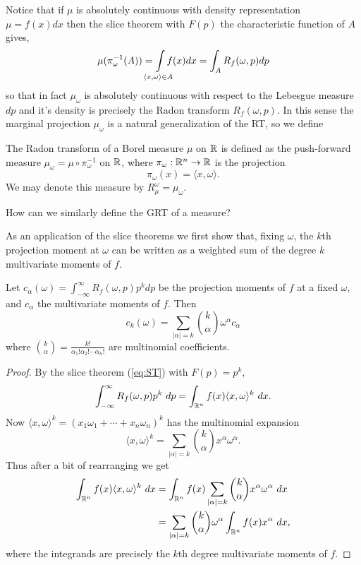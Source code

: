 Notice that if $\mu$ is absolutely continuous with density representation $\mu = f(x)dx$ then the slice theorem with $F(p)$ the characteristic function of $A$ gives,
\[
  \mu(\pi_\omega^{-1}(A)) = \int\mclimits_{\langle x, \omega \rangle \in A} f(x)dx = \int_A R_f(\omega, p) dp
\]
so that in fact $\mu_\omega$ is absolutely continuous with respect to the Lebesgue measure $dp$ and it's density is precisely the Radon transform $R_f(\omega, p)$. In this sense the marginal projection $\mu_\omega$ is a natural generalization of the RT, so we define

\begin{definition}
  The Radon transform of a Borel measure $\mu$ on $\mathbb{R}$ is defined as the push-forward measure $\mu_\omega = \mu \circ \pi_\omega^{-1}$ on $\mathbb{R}$, where $\pi_\omega: \mathbb{R}^n \rightarrow \mathbb{R}$ is the projection 
  \[
    \pi_\omega(x) = \langle x, \omega \rangle.
  \]
  We may denote this measure by $R_\mu^\omega = \mu_\omega$.
\end{definition}

How can we similarly define the GRT of a measure?

As an application of the slice theorems we first show that, fixing $\omega$, the $k$th projection moment at $\omega$ can be written as a weighted sum of the degree $k$ multivariate moments of $f$. 

\begin{proposition}
  Let $c_\alpha (\omega) = \int_{-\infty}^\infty R_f(\omega, p) p^k dp$ be the projection moments of $f$ at a fixed $\omega$, and $c_\alpha$ the multivariate moments of $f$. Then
  \[
      c_k(\omega) = \sum_{|\alpha| = k}\binom{k}{\alpha} \omega^\alpha c_\alpha
  \]
  where $\binom{k}{\alpha} = \frac{k!}{\alpha_1! \alpha_2! \cdots \alpha_n!}$ are multinomial coefficients.
\end{proposition}

\begin{proof}
  By the slice theorem (\ref{eq:ST}) with $F(p) = p^k$,
  \[
    \int_{-\infty}^\infty R_f(\omega, p) p^k ~dp 
    = \int_{\mathbb{R}^n} f(x) \langle x, \omega \rangle^k ~dx.
  \]
  Now $\langle x, \omega \rangle^k = {(x_1 \omega_1 + \cdots + x_n \omega_n)}^k$ has the multinomial expansion
  \[
    \langle x, \omega \rangle^k = \sum_{|\alpha| = k}\binom{k}{\alpha} x^\alpha\omega^\alpha.
  \]
  Thus after a bit of rearranging we get
  \begin{align*}
    \int_{\mathbb{R}^n} f(x) \langle x, \omega \rangle^k ~dx
    &= \int_{\mathbb{R}^n} f(x) \sum_{|\alpha| = k}\binom{k}{\alpha} x^\alpha \omega^\alpha ~dx \\
    &= \sum_{|\alpha| = k}\binom{k}{\alpha} \omega^\alpha \int_{\mathbb{R}^n} f(x) x^\alpha ~dx,
  \end{align*}
  where the integrands are precisely the $k$th degree multivariate moments of $f$.
\end{proof}


